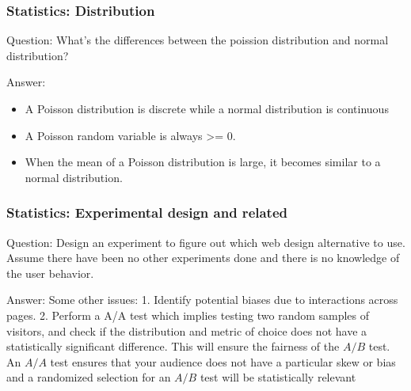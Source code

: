 \documentclass[11pt]{beamer}
\begin{document}
\begin{frame}
\frametitle{Statistics: Distribution}
\begin{block}{Question:}
	What’s the differences between the poission distribution and normal distribution?
\end{block}
\begin{block}{Answer:}
		\begin{itemize}
			\item A Poisson distribution is discrete while a normal distribution is continuous
			\item A Poisson random variable is always >= 0.
			\item When the mean of a Poisson distribution is large, it becomes similar to a normal distribution.
		\end{itemize}
\end{block}
\end{frame}

\begin{frame}
\frametitle{Statistics: Experimental design and related}
\begin{block}{Question:}
	Design an experiment to figure out which web design alternative to use. Assume there have been no other experiments done and there is no knowledge of the user behavior.
\end{block}
\begin{block}{Answer:}
	Some other issues:
	1. Identify potential biases due to interactions across pages. 
	2. Perform a A/A test which implies testing two random samples of visitors, and check if the distribution and metric of choice does not have a statistically significant difference. This will ensure the fairness of the $A/B$ test. An $A/A$ test ensures that your audience does not have a particular skew or bias and a randomized selection for an $A/B$ test will be statistically relevant
\end{block}
\end{frame}
\end{document}
